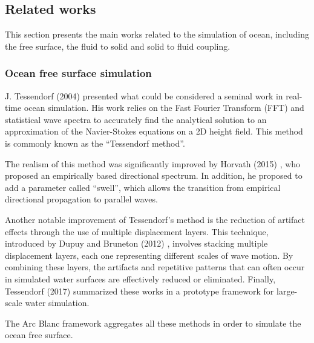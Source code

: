 \documentclass[final]{jcgt}
\def\Framework{The Arc Blanc framework\xspace}
\begin{document}
\subsection{Related works}
\label{sec:relatedwork}
This section presents the main works related to the simulation of ocean, including the free surface, the fluid to solid and solid to fluid coupling.

\subsubsection{Ocean free surface simulation}
\label{subsubsec:oceanFreeSurfaceSim}
J. Tessendorf (2004) \cite{tessendorfSimulatingOceanWater1999} presented what could be considered a seminal work in real-time ocean simulation. His work relies on the Fast Fourier Transform (FFT) and statistical wave spectra to accurately find the analytical solution to an approximation of the Navier-Stokes equations on a 2D height field. This method is commonly known as the “Tessendorf method”.

The realism of this method was significantly improved by Horvath (2015) \cite{horvathEmpiricalDirectionalWave2015}, who proposed an empirically based directional spectrum.
In addition, he proposed to add a parameter called “swell”, which allows the transition from empirical directional propagation to parallel waves.

Another notable improvement of Tessendorf's method is the reduction of artifact effects through the use of multiple displacement layers.
This technique, introduced by Dupuy and Bruneton (2012) \cite{dupuyRealtimeAnimationRendering2012}, involves stacking multiple displacement layers, each one representing different scales of wave motion.
By combining these layers, the artifacts and repetitive patterns that can often occur in simulated water surfaces are effectively reduced or eliminated.
Finally, Tessendorf (2017) \cite{tessendorfGilliganPrototypeFramework2017} summarized these works in a prototype framework for large-scale water simulation.

\Framework aggregates all these methods in order to simulate the ocean free surface.
\end{document}
